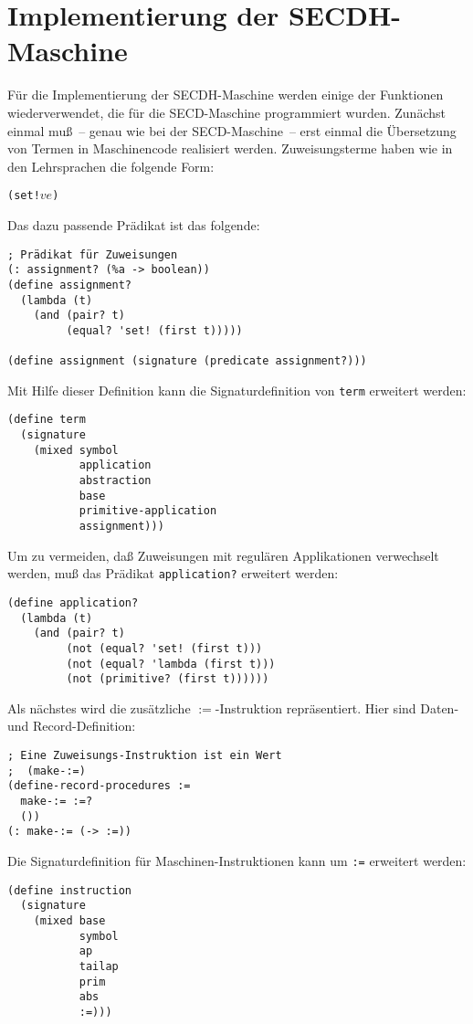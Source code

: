 \section{Implementierung der SECDH-Maschine}


Für die Implementierung der SECDH-Maschine werden einige der
Funktionen wiederverwendet, die für die SECD-Maschine programmiert
wurden.  Zunächst einmal muß~-- genau wie bei der SECD-Maschine~--
erst einmal die Übersetzung von Termen in Maschinencode realisiert
werden.  Zuweisungsterme haben wie in den Lehrsprachen die folgende Form:
%
\begin{alltt}
(set! \(v\) \(e\))
\end{alltt}
%
Das dazu passende Prädikat ist das folgende:
%
\begin{verbatim}
; Prädikat für Zuweisungen
(: assignment? (%a -> boolean))
(define assignment?
  (lambda (t)
    (and (pair? t)
         (equal? 'set! (first t)))))

(define assignment (signature (predicate assignment?)))
\end{verbatim}
%
Mit Hilfe dieser Definition kann die Signaturdefinition von
\texttt{term} erweitert werden:
%
\begin{verbatim}
(define term
  (signature
    (mixed symbol
           application
           abstraction
           base
           primitive-application
           assignment)))
\end{verbatim}
%
Um zu vermeiden, daß Zuweisungen mit regulären Applikationen
verwechselt werden, muß das Prädikat \texttt{application?} erweitert
werden:
%
\begin{verbatim}
(define application?
  (lambda (t)
    (and (pair? t)
         (not (equal? 'set! (first t)))
         (not (equal? 'lambda (first t)))
         (not (primitive? (first t))))))
\end{verbatim}
%
Als nächstes wird die zusätzliche $\mathtt{:=}$-Instruktion
repräsentiert.  Hier sind Daten- und Record-Definition:
%
\begin{verbatim}
; Eine Zuweisungs-Instruktion ist ein Wert
;  (make-:=)
(define-record-procedures :=
  make-:= :=?
  ())
(: make-:= (-> :=))
\end{verbatim}
%
Die Signaturdefinition für Maschinen-Instruktionen kann um \texttt{:=}
erweitert werden:
%
\begin{verbatim}
(define instruction
  (signature
    (mixed base
           symbol
           ap
           tailap
           prim
           abs
           :=)))
\end{verbatim}


